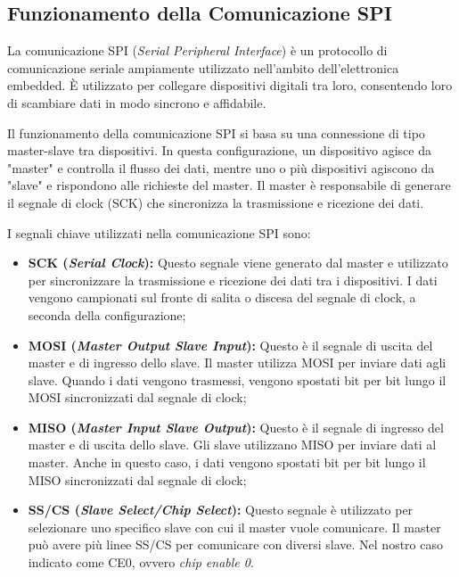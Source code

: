 \documentclass[titlepage]{report}
\begin{document}
		\subsection*{Funzionamento della Comunicazione SPI}
		\label{subsec:funzionamento_spi_comm}
			La comunicazione SPI (\textit{Serial Peripheral Interface}) è un protocollo di comunicazione seriale ampiamente utilizzato nell'ambito dell'elettronica embedded. È utilizzato per collegare dispositivi digitali tra loro, consentendo loro di scambiare dati in modo sincrono e affidabile. 

			Il funzionamento della comunicazione SPI si basa su una connessione di tipo master-slave tra dispositivi. In questa configurazione, un dispositivo agisce da "master" e controlla il flusso dei dati, mentre uno o più dispositivi agiscono da "slave" e rispondono alle richieste del master. Il master è responsabile di generare il segnale di clock (SCK) che sincronizza la trasmissione e ricezione dei dati.

			I segnali chiave utilizzati nella comunicazione SPI sono:
			\begin{itemize}
			\item \textbf{SCK (\textit{Serial Clock}):} Questo segnale viene generato dal master e utilizzato per sincronizzare la trasmissione e ricezione dei dati tra i dispositivi. I dati vengono campionati sul fronte di salita o discesa del segnale di clock, a seconda della configurazione;
			
			\item \textbf{MOSI (\textit{Master Output Slave Input}):} Questo è il segnale di uscita del master e di ingresso dello slave. Il master utilizza MOSI per inviare dati agli slave. Quando i dati vengono trasmessi, vengono spostati bit per bit lungo il MOSI sincronizzati dal segnale di clock;
			
			\item \textbf{MISO (\textit{Master Input Slave Output}):} Questo è il segnale di ingresso del master e di uscita dello slave. Gli slave utilizzano MISO per inviare dati al master. Anche in questo caso, i dati vengono spostati bit per bit lungo il MISO sincronizzati dal segnale di clock;
			
			\item \textbf{SS/CS (\textit{Slave Select/Chip Select}):} Questo segnale è utilizzato per selezionare uno specifico slave con cui il master vuole comunicare. Il master può avere più linee SS/CS per comunicare con diversi slave. Nel nostro caso indicato come CE0, ovvero \textit{chip enable 0}.
			\end{itemize}
\end{document}
